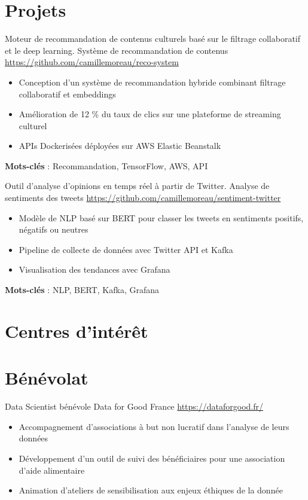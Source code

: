 \documentclass[a4paper, serif, 10pt]{moderncv}
\begin{document}
\section{Projets}

        {Moteur de recommandation de contenus culturels basé sur le filtrage collaboratif et le deep learning.}
        {Système de recommandation de contenus}
        {\url{https://github.com/camillemoreau/reco-system}}
        {}
        {\begin{itemize}
\item Conception d'un système de recommandation hybride combinant filtrage collaboratif et embeddings
\item Amélioration de 12 \% du taux de clics sur une plateforme de streaming culturel
\item APIs Dockerisées déployées sur AWS Elastic Beanstalk
\end{itemize}
\textbf{Mots-clés} : Recommandation, TensorFlow, AWS, API}

        {Outil d'analyse d'opinions en temps réel à partir de Twitter.}
        {Analyse de sentiments des tweets}
        {\url{https://github.com/camillemoreau/sentiment-twitter}}
        {}
        {\begin{itemize}
\item Modèle de NLP basé sur BERT pour classer les tweets en sentiments positifs, négatifs ou neutres
\item Pipeline de collecte de données avec Twitter API et Kafka
\item Visualisation des tendances avec Grafana
\end{itemize}
\textbf{Mots-clés} : NLP, BERT, Kafka, Grafana}
\section{Centres d'intérêt}

\section{Bénévolat}

        {Data Scientist bénévole}
        {Data for Good France}
        {\url{https://dataforgood.fr/}}
        {}
        {\begin{itemize}
\item Accompagnement d'associations à but non lucratif dans l'analyse de leurs données
\item Développement d'un outil de suivi des bénéficiaires pour une association d'aide alimentaire
\item Animation d'ateliers de sensibilisation aux enjeux éthiques de la donnée
\end{itemize}}
    
\end{document}
